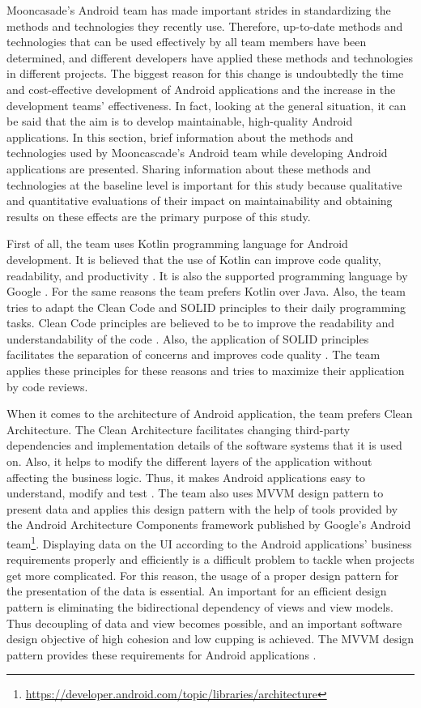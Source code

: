 Mooncasade's Android team has made important strides in standardizing the methods and technologies they recently use. Therefore, up-to-date methods and technologies that can be used effectively by all team members have been determined, and different developers have applied these methods and technologies in different projects. The biggest reason for this change is undoubtedly the time and cost-effective development of Android applications and the increase in the development teams' effectiveness. In fact, looking at the general situation, it can be said that the aim is to develop maintainable, high-quality Android applications. In this section, brief information about the methods and technologies used by Mooncascade's Android team while developing Android applications are presented. Sharing information about these methods and technologies at the baseline level is important for this study because qualitative and quantitative evaluations of their impact on maintainability and obtaining results on these effects are the primary purpose of this study.

First of all, the team uses Kotlin programming language for Android development. It is believed that the use of Kotlin can improve code quality, readability, and productivity \cite{44}. It is also the supported programming language by Google \cite{43}. For the same reasons the team prefers Kotlin over Java. Also, the team tries to adapt the Clean Code and SOLID principles to their daily programming tasks. Clean Code principles are believed to be to improve the readability and understandability of the code \cite{46}. Also, the application of SOLID principles facilitates the separation of concerns and improves code quality \cite{26}. The team applies these principles for these reasons and tries to maximize their application by code reviews.

When it comes to the architecture of Android application, the team prefers Clean Architecture. The Clean Architecture facilitates changing third-party dependencies and implementation details of the software systems that it is used on. Also, it helps to modify the different layers of the application without affecting the business logic. Thus, it makes Android applications easy to understand, modify and test \cite{47}. The team also uses MVVM design pattern to present data and applies this design pattern with the help of tools provided by the Android Architecture Components framework published by Google's Android team\footnote{\url{https://developer.android.com/topic/libraries/architecture}\label{ft:arch-components}}. Displaying data on the UI according to the Android applications' business requirements properly and efficiently is a difficult problem to tackle when projects get more complicated. For this reason, the usage of a proper design pattern for the presentation of the data is essential. An important for an efficient design pattern is eliminating the bidirectional dependency of views and view models. Thus decoupling of data and view becomes possible, and an important software design objective of high cohesion and low cupping is achieved. The MVVM design pattern provides these requirements for Android applications \cite{48}.

